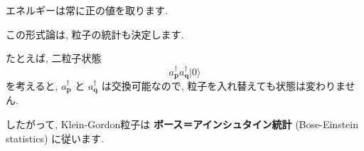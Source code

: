 \documentclass[a4paper,12pt]{article}
\begin{document}
エネルギーは常に正の値を取ります.

\vspace{0.5em}

この形式論は, 粒子の統計も決定します.

たとえば, 二粒子状態
\begin{equation*}
a^\dagger_{\mathbf{p}} a^\dagger_{\mathbf{q}} \lvert 0 \rangle
\end{equation*}
を考えると, $a^\dagger_{\mathbf{p}}$ と $a^\dagger_{\mathbf{q}}$ は交換可能なので,
粒子を入れ替えても状態は変わりません.

したがって, Klein-Gordon粒子は
\textbf{ボース＝アインシュタイン統計} (Bose-Einstein statistics) に従います.


 
\end{document}
